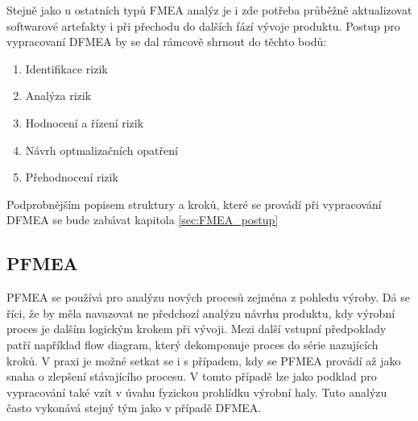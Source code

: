 Stejně jako u ostatních typů FMEA analýz je i zde potřeba průběžně aktualizovat softwarové artefakty i při přechodu do dalších fází vývoje produktu. Postup pro vypracovaní DFMEA by se dal rámcově shrnout do těchto bodů: 
\begin{enumerate}
	\item Identifikace rizik
	\item Analýza rizik
	\item Hodnocení a řízení rizik 
	\item Návrh optmalizačních opatření
	\item Přehodnocení rizik
\end{enumerate}
Podprobnějším popisem struktury a kroků, které se provádí při vypracování DFMEA se bude zabávat kapitola \ref{sec:FMEA_postup}

\subsection{PFMEA}
PFMEA se používá pro analýzu nových procesů zejména z pohledu výroby. Dá se říci, že by měla navazovat ne předchozí analýzu návrhu produktu, kdy výrobní proces je dalším logickým krokem při vývoji. Mezi další vstupní předpoklady patří například flow diagram, který dekomponuje proces do série nazujících kroků. V praxi je možné setkat se i s případem, kdy se PFMEA provádí až jako snaha o zlepšení stávajícího procesu. V tomto případě lze jako podklad pro vypracování také vzít v úvahu fyzickou prohlídku výrobní haly. Tuto analýzu často vykonává stejný tým jako v případě DFMEA.  



\endinput